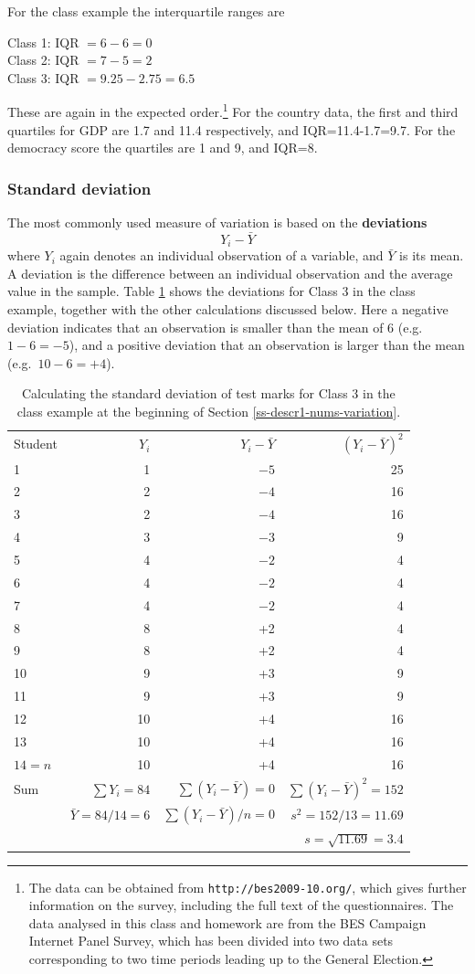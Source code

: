 \documentclass[11pt,a4paper,openany]{book}
\let\rmarkdownfootnote\footnote%
\def\footnote{\protect\rmarkdownfootnote}
\begin{document}
For the class example the interquartile ranges are

Class 1: IQR \(= 6-6 =0\)\\
Class 2: IQR \(= 7-5 =2\)\\
Class 3: IQR \(= 9.25-2.75 =6.5\)

These are again in the expected order.\footnote{The data can be obtained
  from \texttt{http://bes2009-10.org/}, which gives further information
  on the survey, including the full text of the questionnaires. The data
  analysed in this class and homework are from the BES Campaign Internet
  Panel Survey, which has been divided into two data sets corresponding
  to two time periods leading up to the General Election.} For the
country data, the first and third quartiles for GDP are 1.7 and 11.4
respectively, and IQR=11.4-1.7=9.7. For the democracy score the
quartiles are 1 and 9, and IQR=8.

\subsubsection*{Standard deviation}\label{standard-deviation}

The most commonly used measure of variation is based on the
\textbf{deviations} \[Y_{i}-\bar{Y}\] where \(Y_{i}\) again denotes an
individual observation of a variable, and \(\bar{Y}\) is its mean. A
deviation is the difference between an individual observation and the
average value in the sample. Table \ref{tab:t-sdex} shows the deviations
for Class 3 in the class example, together with the other calculations
discussed below. Here a negative deviation indicates that an observation
is smaller than the mean of 6 (e.g. \(1-6=-5\)), and a positive
deviation that an observation is larger than the mean
(e.g.~\(10-6=+4\)).

\begin{longtable}[]{@{}lrrr@{}}
\caption{\label{tab:t-sdex} Calculating the standard deviation of test marks
for Class 3 in the class example at the beginning of Section
\ref{ss-descr1-nums-variation}.}\tabularnewline
\toprule
Student & \(Y_{i}\) & \(Y_{i}-\bar{Y}\) &
\((Y_{i}-\bar{Y})^{2}\)\tabularnewline
1 & 1 & \(-5\) & 25\tabularnewline
2 & 2 & \(-4\) & 16\tabularnewline
3 & 2 & \(-4\) & 16\tabularnewline
4 & 3 & \(-3\) & 9\tabularnewline
5 & 4 & \(-2\) & 4\tabularnewline
6 & 4 & \(-2\) & 4\tabularnewline
7 & 4 & \(-2\) & 4\tabularnewline
8 & 8 & +2 & 4\tabularnewline
9 & 8 & +2 & 4\tabularnewline
10 & 9 & +3 & 9\tabularnewline
11 & 9 & +3 & 9\tabularnewline
12 & 10 & +4 & 16\tabularnewline
13 & 10 & +4 & 16\tabularnewline
\(14=n\) & 10 & +4 & 16\tabularnewline
Sum & \(\sum Y_{i}=84\) & \(\sum(Y_{i}-\bar{Y})=0\) &
\(\sum(Y_{i}-\bar{Y})^{2}=152\)\tabularnewline
& \(\bar{Y}=84/14=6\) & \(\sum(Y_{i}-\bar{Y})/n=0\) &
\(s^{2}=152/13=11.69\)\tabularnewline
& & & \(s=\sqrt{11.69}=3.4\)\tabularnewline
\bottomrule
\end{longtable}
\end{document}

